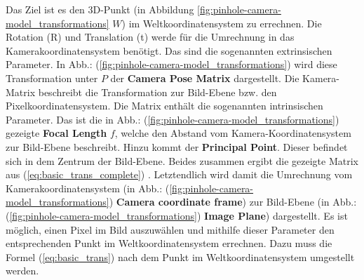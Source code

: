 	Das Ziel ist es den 3D-Punkt (in Abbildung \ref{fig:pinhole-camera-model_transformations} \( W \)) im Weltkoordinatensystem zu errechnen. Die Rotation (R) und Translation (t) werde für die Umrechnung in das Kamerakoordinatensystem benötigt. Das sind die sogenannten extrinsischen Parameter. In Abb.: (\ref{fig:pinhole-camera-model_transformations}) wird diese Transformation unter \( P \) der \textbf{Camera Pose Matrix} dargestellt. \newline
	Die Kamera-Matrix beschreibt die Transformation zur Bild-Ebene bzw. den Pixelkoordinatensystem. Die Matrix enthält die sogenannten intrinsischen Parameter. Das ist die in Abb.: (\ref{fig:pinhole-camera-model_transformations}) gezeigte \textbf{Focal Length} \( f \), welche den Abstand vom Kamera-Koordinatensystem zur Bild-Ebene beschreibt. Hinzu kommt der \textbf{Principal Point}. Dieser befindet sich in dem Zentrum der Bild-Ebene. Beides zusammen ergibt die gezeigte Matrix aus (\ref{eq:basic_trans_complete}) \citep[Vgl.][]{noauthor_opencv_nodate-1}. Letztendlich wird damit die Umrechnung vom Kamerakoordinatensystem (in Abb.: (\ref{fig:pinhole-camera-model_transformations}) \textbf{Camera coordinate frame}) zur Bild-Ebene (in Abb.: (\ref{fig:pinhole-camera-model_transformations}) \textbf{Image Plane}) dargestellt. \newline 
	Es ist möglich, einen Pixel im Bild auszuwählen und mithilfe dieser Parameter den entsprechenden Punkt im Weltkoordinatensystem errechnen. Dazu muss die Formel (\ref{eq:basic_trans}) nach dem Punkt im Weltkoordinatensystem umgestellt werden.
	
